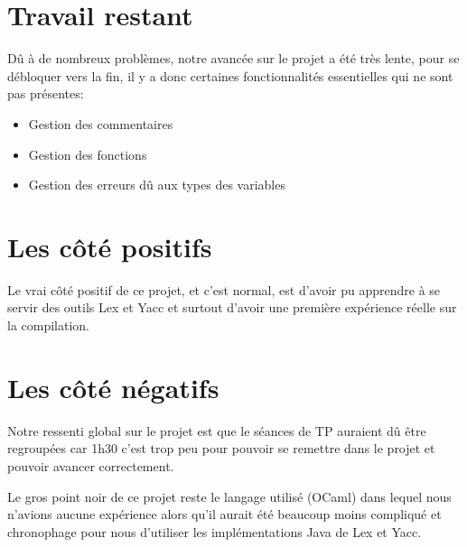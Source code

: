 \section{Travail restant}

Dû à de nombreux problèmes, notre avancée sur le projet a été très lente, pour se débloquer vers la fin, il y a donc certaines fonctionnalités essentielles qui ne sont pas présentes:

\begin{itemize}
    \item Gestion des commentaires
    \item Gestion des fonctions
    \item Gestion des erreurs dû aux types des variables
\end{itemize}

\section{Les côté positifs}

Le vrai côté positif de ce projet, et c'est normal, est d'avoir pu apprendre à se servir des outils Lex et Yacc et surtout d'avoir une première expérience réelle sur la compilation.

\section{Les côté négatifs}

Notre ressenti global sur le projet est que le séances de TP auraient dû être regroupées car 1h30 c'est trop peu pour pouvoir se remettre dans le projet et pouvoir avancer correctement.

Le gros point noir de ce projet reste le langage utilisé (OCaml) dans lequel nous n'avions aucune expérience alors qu'il aurait été beaucoup moins compliqué et chronophage pour nous d'utiliser les implémentations Java de Lex et Yacc.